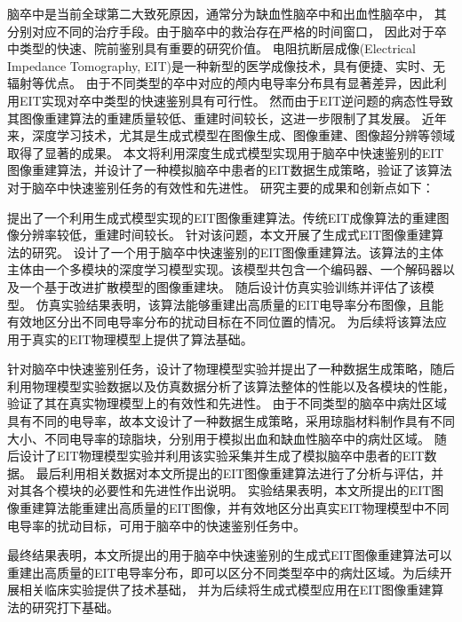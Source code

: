 
\begin{chineseabstract}

    脑卒中是当前全球第二大致死原因，通常分为缺血性脑卒中和出血性脑卒中，
    其分别对应不同的治疗手段。由于脑卒中的救治存在严格的时间窗口，
    因此对于卒中类型的快速、院前鉴别具有重要的研究价值。
    电阻抗断层成像(Electrical Impedance Tomography, EIT)是一种新型的医学成像技术，具有便捷、实时、无辐射等优点。
    由于不同类型的卒中对应的颅内电导率分布具有显著差异，因此利用EIT实现对卒中类型的快速鉴别具有可行性。
    然而由于EIT逆问题的病态性导致其图像重建算法的重建质量较低、重建时间较长，这进一步限制了其发展。
    近年来，深度学习技术，尤其是生成式模型在图像生成、图像重建、图像超分辨等领域取得了显著的成果。
    本文将利用深度生成式模型实现用于脑卒中快速鉴别的EIT图像重建算法，并设计了一种模拟脑卒中患者的EIT数据生成策略，验证了该算法对于脑卒中快速鉴别任务的有效性和先进性。
    研究主要的成果和创新点如下：

    提出了一个利用生成式模型实现的EIT图像重建算法。传统EIT成像算法的重建图像分辨率较低，重建时间较长。
    针对该问题，本文开展了生成式EIT图像重建算法的研究。
    设计了一个用于脑卒中快速鉴别的EIT图像重建算法。该算法的主体主体由一个多模块的深度学习模型实现。该模型共包含一个编码器、一个解码器以及一个基于改进扩散模型的图像重建块。
    随后设计仿真实验训练并评估了该模型。
    仿真实验结果表明，该算法能够重建出高质量的EIT电导率分布图像，且能有效地区分出不同电导率分布的扰动目标在不同位置的情况。
    为后续将该算法应用于真实的EIT物理模型上提供了算法基础。
    

    针对脑卒中快速鉴别任务，设计了物理模型实验并提出了一种数据生成策略，随后利用物理模型实验数据以及仿真数据分析了该算法整体的性能以及各模块的性能，验证了其在真实物理模型上的有效性和先进性。
    由于不同类型的脑卒中病灶区域具有不同的电导率，故本文设计了一种数据生成策略，采用琼脂材料制作具有不同大小、不同电导率的琼脂块，分别用于模拟出血和缺血性脑卒中的病灶区域。
    随后设计了EIT物理模型实验并利用该实验采集并生成了模拟脑卒中患者的EIT数据。
    最后利用相关数据对本文所提出的EIT图像重建算法进行了分析与评估，并对其各个模块的必要性和先进性作出说明。
    实验结果表明，本文所提出的EIT图像重建算法能重建出高质量的EIT图像，并有效地区分出真实EIT物理模型中不同电导率的扰动目标，可用于脑卒中的快速鉴别任务中。
    
    最终结果表明，本文所提出的用于脑卒中快速鉴别的生成式EIT图像重建算法可以重建出高质量的EIT电导率分布，即可以区分不同类型卒中的病灶区域。为后续开展相关临床实验提供了技术基础，
    并为后续将生成式模型应用在EIT图像重建算法的研究打下基础。






\end{chineseabstract}

